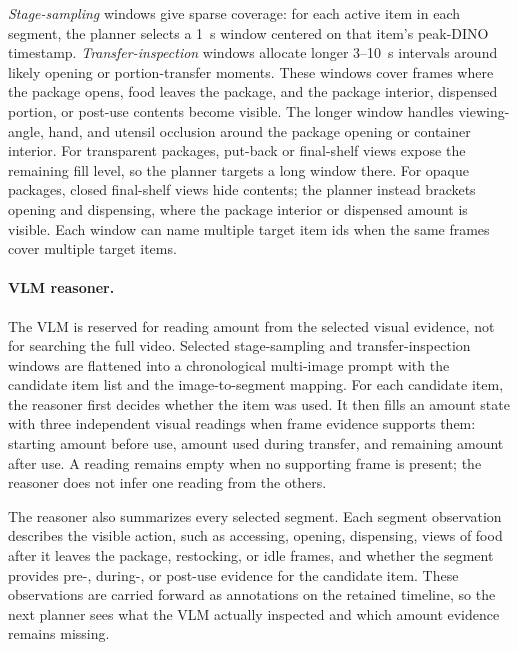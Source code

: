\documentclass[sigconf,anonymous,nonacm]{acmart}
\begin{document}
\emph{Stage-sampling} windows give sparse coverage: for each active item
in each segment, the planner selects a 1~s window centered on that
item's peak-DINO timestamp.
\emph{Transfer-inspection} windows allocate longer 3--10~s intervals
around likely opening or portion-transfer moments. These windows cover
frames where the package opens, food leaves the package, and the package
interior, dispensed portion, or post-use contents become visible. The
longer window handles viewing-angle, hand, and utensil occlusion around
the package opening or container interior.
For transparent packages, put-back or final-shelf views expose the
remaining fill level, so the planner targets a long window there.
For opaque packages, closed final-shelf views hide contents; the planner
instead brackets opening and dispensing, where the package interior or
dispensed amount is visible.
Each window can name multiple target item ids when the same frames cover
multiple target items.

\paragraph{VLM reasoner.}
The VLM is reserved for reading amount from the selected visual evidence,
not for searching the full video. Selected stage-sampling and
transfer-inspection windows are flattened into a chronological
multi-image prompt with the candidate item list and the image-to-segment
mapping. For each candidate item, the reasoner first decides whether the
item was used. It then fills an amount state with three independent
visual readings when frame evidence supports them: starting amount before
use, amount used during transfer, and remaining amount after use. A
reading remains empty when no supporting frame is present; the reasoner
does not infer one reading from the others.

The reasoner also summarizes every selected segment. Each segment observation
describes the visible action, such as accessing, opening, dispensing, views of
food after it leaves the package, restocking, or idle frames, and whether the
segment provides pre-, during-, or post-use evidence for the candidate item.
These observations are carried forward as annotations on the retained timeline,
so the next planner sees what the VLM actually inspected and which amount
evidence remains missing.
\end{document}
